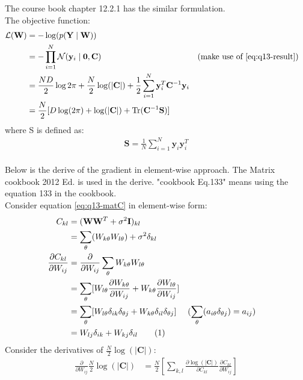 \documentclass[12pt]{article}
\newenvironment{question}[2][Question]{\begin{trivlist}
\kern10pt
\item[\hskip \labelsep {\bfseries #1}\hskip \labelsep {\bfseries #2.}]}{\end{trivlist}}
\newcommand\numberthis{\addtocounter{equation}{1}\tag{\theequation}}
\begin{document}
\begin{question}{15}
The course book chapter 12.2.1 has the similar formulation.\\
The objective function:
\begin{align*}
  \mathcal{L}(\mathbf{W}) &= -\log(p(\mathbf{Y}\mid\mathbf{W})) \\
  &= -\prod_{i=1}^{N} \mathcal{N}(\mathbf{y}_i\mid\mathbf{0}, \mathbf{C})
      && \text{(make use of \eqref{eq:q13-result})} \\
  &= \frac{ND}{2}\log{2\pi} + \frac{N}{2}\log(|\mathbf{C}|) 
     + \frac{1}{2} \sum_{i=1}^{N} \mathbf{y}_i^T \mathbf{C}^{-1}\mathbf{y}_i \\
  &= \frac{N}{2}[D\log(2\pi) + \log(|\mathbf{C}|) + \text{Tr}(\mathbf{C}^{-1}\mathbf{S})]
\end{align*}
where S is defined as:
\begin{align*}
  \mathbf{S} = \frac{1}{N}\sum_{i=1}^{N} \mathbf{y}_i\mathbf{y}_i^T
\end{align*}
\\
Below is the derive of the gradient in element-wise approach. The Matrix cookbook 2012 Ed.
is used in the derive. "cookbook Eq.133" means using the equation 133 in the cookbook.\\
Consider equation \eqref{eq:q13-matC} in element-wise form:
\begin{align*}
  C_{kl} &= (\mathbf{W}\mathbf{W}^T + \sigma^2\mathbf{I})_{kl} \\
  &= \sum_{\theta}(W_{k\theta}W_{l\theta}) + \sigma^2\delta_{kl} \\
  \frac{\partial C_{kl}}{\partial W_{ij}} 
  &= \frac{\partial}{\partial W_{ij}}\sum_{\theta}W_{k\theta}W_{l\theta} \\
  &= \sum_{\theta}[W_{l\theta}\frac{\partial W_{k\theta}}{\partial W_{ij}} 
                 + W_{k\theta}\frac{\partial W_{l\theta}}{\partial W_{ij}}] \\
  &= \sum_{\theta}[W_{l\theta}\delta_{ik}\delta_{\theta j} + W_{k\theta}\delta_{il}\delta_{\theta j}]
    &&(\sum_{\theta}(a_{i\theta}\delta_{\theta j}) = a_{ij}) \\
  &= W_{lj}\delta_{ik} + W_{kj}\delta_{il} \numberthis \label{eq:dCdW}
\end{align*}
Consider the derivatives of $\frac{N}{2}\log(|\mathbf{C}|)$:
\begin{align*}
  \frac{\partial}{\partial W_{ij}}\frac{N}{2}\log(|\mathbf{C}|)
  &= \frac{N}{2}[\sum_{k,l} \frac{\partial \log(|\mathbf{C}|)}{\partial C_{kl}}
                           \frac{\partial C_{kl}}{\partial W_{ij}} ]

\end{align*}
\end{question}
\end{document}
